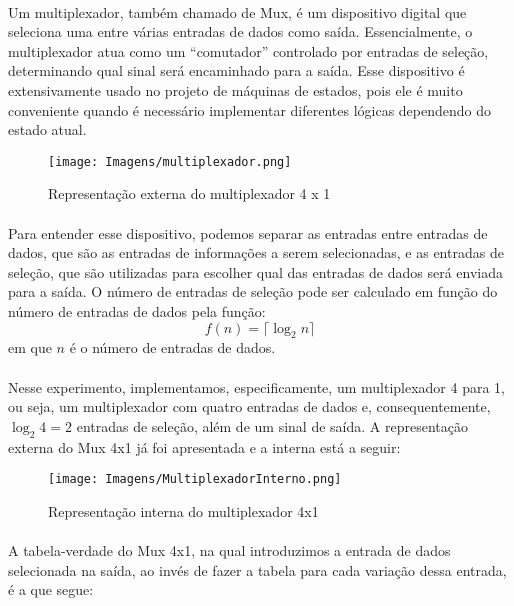 \documentclass[a4paper,12pt]{article}
\begin{document}
\paragraph{}
Um multiplexador, também chamado de Mux, é um dispositivo digital que seleciona uma entre várias entradas de dados como saída. Essencialmente, o multiplexador atua como um ``comutador'' controlado por entradas de seleção, determinando qual sinal será encaminhado para a saída. Esse dispositivo é extensivamente usado no projeto de máquinas de estados, pois ele é muito conveniente quando é necessário implementar diferentes lógicas dependendo do estado atual.

\begin{figure}[H]
    \centering
    \texttt{[image: Imagens/multiplexador.png]}
    \caption{Representação externa do multiplexador 4 x 1}
    \label{fig:Mux_externa}
\end{figure}

\paragraph{}
Para entender esse dispositivo, podemos separar as entradas entre entradas de dados, que são as entradas de informações a serem selecionadas, e as entradas de seleção, que são utilizadas para escolher qual das entradas de dados será enviada para a saída. O número de entradas de seleção pode ser calculado em função do número de entradas de dados pela função: 
\[
f(n) = \lceil \log_2n \rceil
\]
em que $n$ é o número de entradas de dados.

\paragraph{}
Nesse experimento, implementamos, especificamente, um multiplexador 4 para 1, ou seja, um multiplexador com quatro entradas de dados e, consequentemente, $\log_2 4 = 2$ entradas de seleção, além de um sinal de saída. A representação externa do Mux 4x1 já foi apresentada e a interna está a seguir:

\begin{figure}[H]
    \centering
    \texttt{[image: Imagens/MultiplexadorInterno.png]}
    \caption{Representação interna do multiplexador 4x1}
    \label{fig:Mux_interna}
\end{figure}

\paragraph{}
A tabela-verdade do Mux 4x1, na qual introduzimos a entrada de dados selecionada na saída, ao invés de fazer a tabela para cada variação dessa entrada, é a que segue:
\end{document}
